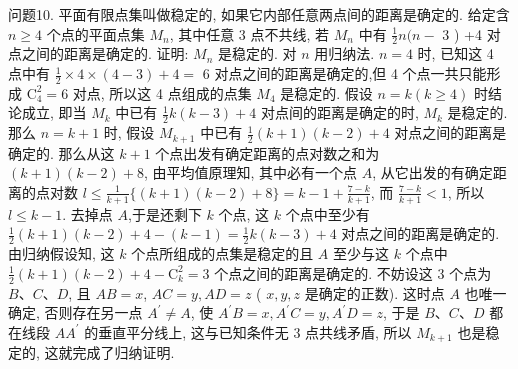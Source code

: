 问题10. 平面有限点集叫做稳定的, 如果它内部任意两点间的距离是确定的.
给定含 $n \geqslant 4$ 个点的平面点集 $M_n$, 其中任意 3 点不共线, 若 $M_n$ 中有 $\frac{1}{2} n(n-$ 3 ) +4 对点之间的距离是确定的.
证明: $M_n$ 是稳定的.
对 $n$ 用归纳法.
$n=4$ 时, 已知这 4 点中有 $\frac{1}{2} \times 4 \times(4-3)+4=$ 6 对点之间的距离是确定的,但 4 个点一共只能形成 $\mathrm{C}_4^2=6$ 对点, 所以这 4 点组成的点集 $M_4$ 是稳定的.
假设 $n=k(k \geqslant 4)$ 时结论成立, 即当 $M_k$ 中已有 $\frac{1}{2} k(k-3)+4$ 对点间的距离是确定的时, $M_k$ 是稳定的.
那么 $n=k+1$ 时, 假设 $M_{k+1}$ 中已有 $\frac{1}{2}(k+1)(k-2)+4$ 对点之间的距离是确定的.
那么从这 $k+1$ 个点出发有确定距离的点对数之和为 $(k+1)(k-2)+8$, 由平均值原理知, 其中必有一个点 $A$, 从它出发的有确定距离的点对数 $l \leqslant \frac{1}{k+1}\{(k+1)(k-2)+8\}=k-1+\frac{7-k}{k+1}$, 而 $\frac{7-k}{k+1}<1$, 所以 $l \leqslant k-1$. 去掉点 $A$,于是还剩下 $k$ 个点, 这 $k$ 个点中至少有 $\frac{1}{2}(k+1)(k-2)+4- (k-1)=\frac{1}{2} k(k-3)+4$ 对点之间的距离是确定的.
由归纳假设知, 这 $k$ 个点所组成的点集是稳定的且 $A$ 至少与这 $k$ 个点中 $\frac{1}{2}(k+1)(k-2)+4- \mathrm{C}_k^2=3$ 个点之间的距离是确定的.
不妨设这 3 个点为 $B 、 C 、 D$, 且 $A B=x$, $A C=y, A D=z$ ( $x, y, z$ 是确定的正数). 这时点 $A$ 也唯一确定, 否则存在另一点 $A^{\prime} \neq A$, 使 $A^{\prime} B=x, A^{\prime} C=y, A^{\prime} D=z$, 于是 $B 、 C 、 D$ 都在线段 $A A^{\prime}$ 的垂直平分线上, 这与已知条件无 3 点共线矛盾, 所以 $M_{k+1}$ 也是稳定的, 这就完成了归纳证明.


